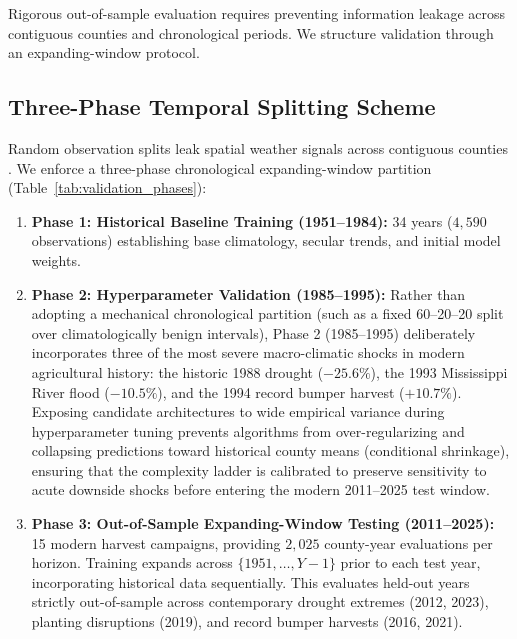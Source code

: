 Rigorous out-of-sample evaluation requires preventing information leakage across contiguous counties and chronological periods. We structure validation through an expanding-window protocol.

\subsection{Three-Phase Temporal Splitting Scheme}
\label{sec:meth_expanding_split}

Random observation splits leak spatial weather signals across contiguous counties \citep{Sweetetal2023}. We enforce a three-phase chronological expanding-window partition (Table~\ref{tab:validation_phases}):
\begin{enumerate}
    \item \textbf{Phase 1: Historical Baseline Training (1951--1984):} 34 years ($4{,}590$ observations) establishing base climatology, secular trends, and initial model weights.
    \item \textbf{Phase 2: Hyperparameter Validation (1985--1995):} Rather than adopting a mechanical chronological partition (such as a fixed 60--20--20 split over climatologically benign intervals), Phase 2 (1985--1995) deliberately incorporates three of the most severe macro-climatic shocks in modern agricultural history: the historic 1988 drought ($-25.6\%$), the 1993 Mississippi River flood ($-10.5\%$), and the 1994 record bumper harvest ($+10.7\%$). Exposing candidate architectures to wide empirical variance during hyperparameter tuning prevents algorithms from over-regularizing and collapsing predictions toward historical county means (conditional shrinkage), ensuring that the complexity ladder is calibrated to preserve sensitivity to acute downside shocks before entering the modern 2011--2025 test window.
    \item \textbf{Phase 3: Out-of-Sample Expanding-Window Testing (2011--2025):} 15 modern harvest campaigns, providing $2{,}025$ county-year evaluations per horizon. Training expands across $\{1951, \dots, Y-1\}$ prior to each test year, incorporating historical data sequentially. This evaluates held-out years strictly out-of-sample across contemporary drought extremes (2012, 2023), planting disruptions (2019), and record bumper harvests (2016, 2021).
\end{enumerate}

